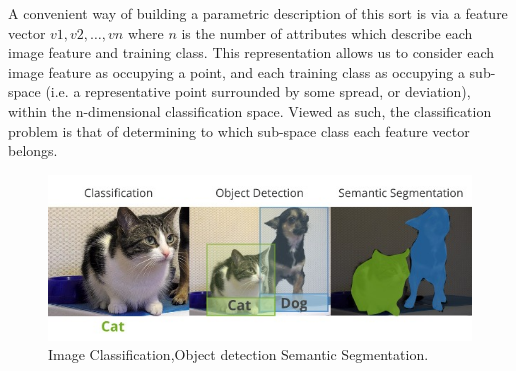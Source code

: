 A convenient way of building a parametric description of this sort is via a feature vector $v1,v2,\dots,vn$ where $n$ is the number of attributes which describe each image feature and training class. This representation allows us to consider each image feature as occupying a point, and each training class as occupying a sub-space (i.e. a representative point surrounded by some spread, or deviation), within the n-dimensional classification space. Viewed as such, the classification problem is that of determining to which sub-space class each feature vector belongs.
\begin{figure}[H]
	\centering
	\includegraphics[width=0.7\linewidth]{images/classification_detection_segmentaion_comparisons.jpeg}
	\caption{Image Classification,Object detection Semantic Segmentation.}
\end{figure}
